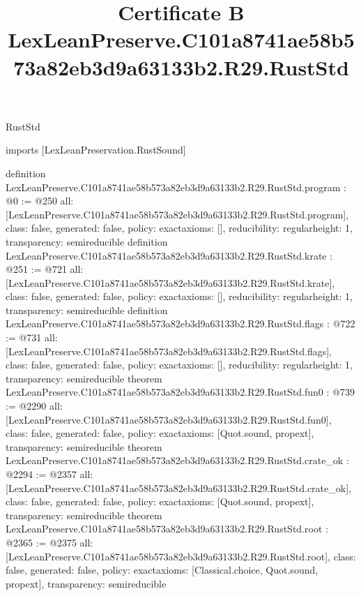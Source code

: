 \begin{lexlean}{RustStd}
\title{Certificate B LexLeanPreserve.C101a8741ae58b573a82eb3d9a63133b2.R29.RustStd}
\begin{coremodule}
imports [LexLeanPreservation.RustSound]

definition LexLeanPreserve.C101a8741ae58b573a82eb3d9a63133b2.R29.RustStd.program : @0 := @250 {
  all: [LexLeanPreserve.C101a8741ae58b573a82eb3d9a63133b2.R29.RustStd.program],
  class: false,
  generated: false,
  policy: exact{axioms: []},
  reducibility: regular{height: 1},
  transparency: semireducible
}
definition LexLeanPreserve.C101a8741ae58b573a82eb3d9a63133b2.R29.RustStd.krate : @251 := @721 {
  all: [LexLeanPreserve.C101a8741ae58b573a82eb3d9a63133b2.R29.RustStd.krate],
  class: false,
  generated: false,
  policy: exact{axioms: []},
  reducibility: regular{height: 1},
  transparency: semireducible
}
definition LexLeanPreserve.C101a8741ae58b573a82eb3d9a63133b2.R29.RustStd.flags : @722 := @731 {
  all: [LexLeanPreserve.C101a8741ae58b573a82eb3d9a63133b2.R29.RustStd.flags],
  class: false,
  generated: false,
  policy: exact{axioms: []},
  reducibility: regular{height: 1},
  transparency: semireducible
}
theorem LexLeanPreserve.C101a8741ae58b573a82eb3d9a63133b2.R29.RustStd.fun0 : @739 := @2290 {
  all: [LexLeanPreserve.C101a8741ae58b573a82eb3d9a63133b2.R29.RustStd.fun0],
  class: false,
  generated: false,
  policy: exact{axioms: [Quot.sound, propext]},
  transparency: semireducible
}
theorem LexLeanPreserve.C101a8741ae58b573a82eb3d9a63133b2.R29.RustStd.crate_ok : @2294 := @2357 {
  all: [LexLeanPreserve.C101a8741ae58b573a82eb3d9a63133b2.R29.RustStd.crate_ok],
  class: false,
  generated: false,
  policy: exact{axioms: [Quot.sound, propext]},
  transparency: semireducible
}
theorem LexLeanPreserve.C101a8741ae58b573a82eb3d9a63133b2.R29.RustStd.root : @2365 := @2375 {
  all: [LexLeanPreserve.C101a8741ae58b573a82eb3d9a63133b2.R29.RustStd.root],
  class: false,
  generated: false,
  policy: exact{axioms: [Classical.choice, Quot.sound, propext]},
  transparency: semireducible
}


\end{coremodule}
\end{lexlean}
